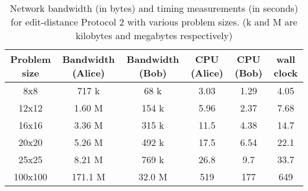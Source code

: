 \begin{table*}
\begin{centering}
\begin{tabular}{|c||c|c|c|c|c|}
\hline 
Problem size &
Bandwidth (Alice) &
Bandwidth (Bob) &
CPU (Alice) &
CPU (Bob) &
wall clock \tabularnewline
\hline
\hline 
8x8 &
717 k &
68 k &
3.03 &
1.29 &
4.05 \tabularnewline
\hline 
12x12 &
1.60 M &
154 k &
5.96 &
2.37 &
7.68 \tabularnewline
\hline 
16x16 &
3.36 M &
315 k &
11.5 &
4.38 &
14.7 \tabularnewline
\hline 
20x20 &
5.26 M &
492 k &
17.5 &
6.54 &
22.1 \tabularnewline
\hline 
25x25 &
8.21 M &
769 k &
26.8 &
9.7 &
33.7 \tabularnewline
\hline 
100x100 &
171.1 M&
32.0 M&
519 &
177 &
649 \tabularnewline
\hline
\end{tabular}
\par\end{centering}


\caption{Network bandwidth (in bytes) and timing measurements (in seconds)
for edit-distance Protocol 2 with various problem sizes. (k and M
are kilobytes and megabytes respectively)}

\label{protocol2table} 
\end{table*}








